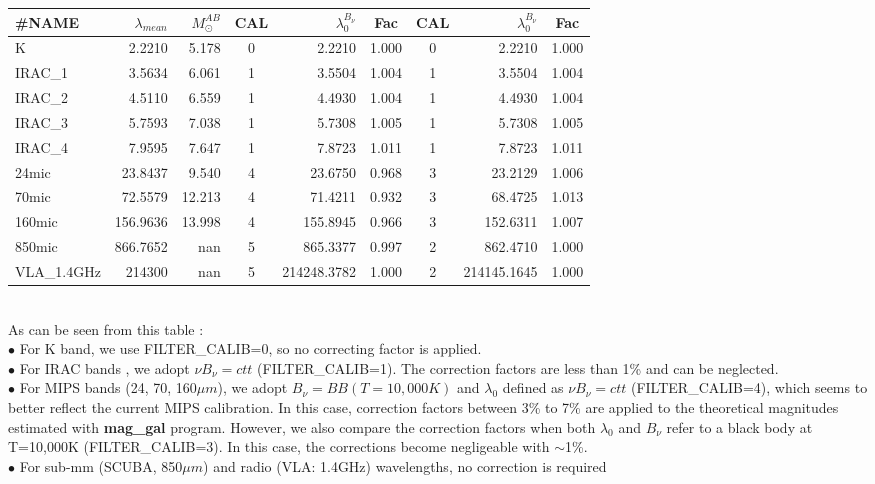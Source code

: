 \documentclass[12pt]{article}
\begin{document}
\begin{tabular}{| l | rr | crc | crc | }
\hline
\#NAME&$\lambda_{mean}$&$M_{\odot}^{AB}$& CAL & $\lambda_{0}^{B_{\nu}}$ & Fac& CAL & $\lambda_{0}^{B_{\nu}}$ & Fac \\
\hline
 K          &2.2210         & 5.178 & 0 &         2.2210 & 1.000& 0 &            2.2210 & 1.000 \\
IRAC\_1&3.5634         &6.061  & 1 &         3.5504 & 1.004& 1 &            3.5504 & 1.004 \\
IRAC\_2&4.5110         & 6.559 & 1 &         4.4930 & 1.004& 1 &            4.4930 & 1.004 \\
IRAC\_3&5.7593         &7.038  & 1 &         5.7308 & 1.005& 1 &            5.7308 & 1.005 \\
IRAC\_4&7.9595         &7.647  & 1 &          7.8723& 1.011& 1 &            7.8723 & 1.011 \\
24mic    &23.8437       &9.540  & 4 &        23.6750& 0.968& 3 &          23.2129 & 1.006 \\
70mic    &72.5579       &12.213& 4 &        71.4211& 0.932& 3 &          68.4725 & 1.013 \\
160mic  &156.9636     &13.998& 4 &      155.8945& 0.966& 3 &        152.6311 & 1.007 \\
850mic  &866.7652     & nan    & 5 &      865.3377& 0.997& 2 &         862.4710& 1.000 \\
VLA\_1.4GHz&214300& nan    & 5 & 214248.3782&1.000& 2 &   214145.1645& 1.000 \\
\hline
\end{tabular}
\vspace*{0.5cm}\\
 As can be seen from this table : \\
$\bullet$ For K band, we use FILTER\_CALIB=0, so no correcting factor is applied.\\
%
$\bullet$ For IRAC bands , we adopt  $\nu B_{\nu}=ctt$ (FILTER\_CALIB=1). 
 The correction factors are less than 1\% and can be neglected.\\
$\bullet$ For MIPS bands (24, 70, 160$\mu m$), we adopt  $B_{\nu}=BB(T=10,000K)$ and $\lambda_0$ defined as $\nu B_ {\nu}=ctt$ (FILTER\_CALIB=4), which seems to better reflect the
current MIPS calibration. In this case, correction factors between 3\% to 7\% are applied to
 the theoretical magnitudes estimated with {\bf mag\_gal} program.
% 
However, we also compare the correction factors when both $\lambda_0$ and $B_{\nu}$ refer to a 
black body at T=10,000K (FILTER\_CALIB=3). In this case,  the corrections become
negligeable with $\sim$1\%. \\
%
$\bullet$ For sub-mm (SCUBA, 850$\mu m$) and radio (VLA: 1.4GHz) wavelengths, no correction is required\\
%
\end{document}
